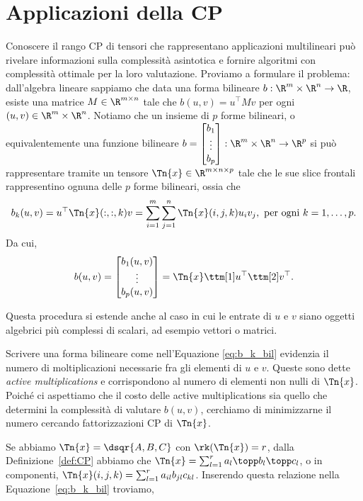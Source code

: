 \chapter{Applicazioni della CP}

Conoscere il rango CP di tensori che rappresentano applicazioni multilineari può rivelare
informazioni sulla complessità asintotica e fornire algoritmi con complessità ottimale per la loro
valutazione. Proviamo a formulare il problema: dall'algebra lineare sappiamo che data una forma
bilineare $ b : \R^m \times \R^n \to \R $, esiste una matrice $ M \in \R^{m \times n} $ tale che $
b(u,v) = u^{\top}Mv$ per ogni $ (u,v) \in \R^m \times \R^n $.
Notiamo che un insieme di $ p $ forme bilineari, o equivalentemente una funzione bilineare $
b = \begin{bmatrix} b_1 \\ \vdots \\ b_p \end{bmatrix} :  \R^m \times \R^n  \to \R^p$ si può
rappresentare tramite un tensore $ \Tn{x} \in \R^{m \times n\times p} $ tale che le sue slice
frontali rappresentino ognuna delle $ p $ forme bilineari, ossia che
\begin{equation}
  \label{eq:b_k_bil}
  b_k(u,v) = u^{\top}\Tn{x}(:,:,k)v = \sum_{i=1}^m\sum_{j=1}^n \Tn{x}(i,j,k)u_iv_j, \text{ per ogni
  } k = 1, \ldots, p
.\end{equation}
Da cui, 
\begin{equation}
  \label{eq:b_tuv}
 b(u,v) = \begin{bmatrix} b_1(u,v) \\ \vdots \\ b_p(u,v) \end{bmatrix} = \Tn{x} \ttm[1] u^{\top}
 \ttm[2] v^{\top}.
\end{equation}
\begin{remark}
  Questa procedura si estende anche al caso in cui le entrate di $ u $ e $ v $ siano oggetti
  algebrici più complessi di scalari, ad esempio vettori o matrici.
\end{remark}
\begin{remark}
  Scrivere una forma bilineare come nell'Equazione \ref{eq:b_k_bil} evidenzia il numero di
  moltiplicazioni necessarie fra gli elementi di $ u $ e $ v $. Queste sono dette \emph{active
  multiplications} e corrispondono al numero di elementi non nulli di $ \Tn{x} $. Poiché ci aspettiamo che
  il costo delle active multiplications sia quello che determini la complessità di valutare $ b(u,v)
  $, cerchiamo di minimizzarne il numero cercando fattorizzazioni CP di $ \Tn{x} $.
\end{remark}
Se abbiamo $ \Tn{x} = \dsqr{A,B,C} $ con $ \rk(\Tn{x}) = r$, dalla Definizione~\ref{def:CP} abbiamo che $ \Tn{x} = \sum_{l=1}^r a_l \topp b_l \topp c_l $, o in componenti, $ \Tn{x}(i,j,k) = \sum_{l=1}^r a_{il}b_{jl}c_{kl} $. Inserendo questa relazione nella Equazione~\ref{eq:b_k_bil} troviamo,


